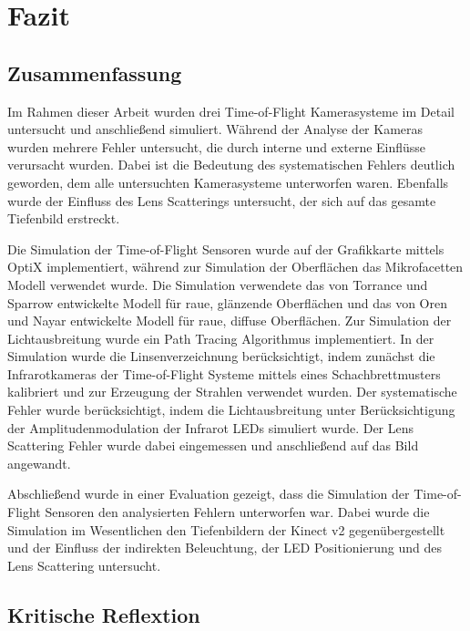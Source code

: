 \documentclass[thesis.tex]{subfiles}
\begin{document}
\chapter{Fazit}
\label{chap:conclusion}

\section{Zusammenfassung}

Im Rahmen dieser Arbeit wurden drei Time-of-Flight Kamerasysteme im Detail untersucht und anschließend simuliert. Während der Analyse der Kameras wurden mehrere Fehler untersucht, die durch interne und externe Einflüsse verursacht wurden. Dabei ist die Bedeutung des systematischen Fehlers deutlich geworden, dem alle untersuchten Kamerasysteme unterworfen waren. Ebenfalls wurde der Einfluss des Lens Scatterings untersucht, der sich auf das gesamte Tiefenbild erstreckt. 

Die Simulation der Time-of-Flight Sensoren wurde auf der Grafikkarte mittels OptiX implementiert, während zur Simulation der Oberflächen das Mikrofacetten Modell verwendet wurde. Die Simulation verwendete das von Torrance und Sparrow \cite{bib:TorranceSparrow1967} entwickelte Modell für raue, glänzende Oberflächen und das von Oren und Nayar \cite{bib:OrenNayar1994} entwickelte Modell für raue, diffuse Oberflächen. Zur Simulation der Lichtausbreitung wurde ein Path Tracing Algorithmus implementiert. In der Simulation wurde die Linsenverzeichnung berücksichtigt, indem zunächst die Infrarotkameras der Time-of-Flight Systeme mittels eines Schachbrettmusters kalibriert und zur Erzeugung der Strahlen verwendet wurden. Der systematische Fehler wurde berücksichtigt, indem die Lichtausbreitung unter Berücksichtigung der Amplitudenmodulation der Infrarot LEDs simuliert wurde. Der Lens Scattering Fehler wurde dabei eingemessen und anschließend auf das Bild angewandt.

Abschließend wurde in einer Evaluation gezeigt, dass die Simulation der Time-of-Flight Sensoren den analysierten Fehlern unterworfen war. Dabei wurde die Simulation im Wesentlichen den Tiefenbildern der Kinect v2 gegenübergestellt und der Einfluss der indirekten Beleuchtung, der LED Positionierung und des Lens Scattering untersucht.  

\section{Kritische Reflextion}
\end{document}
